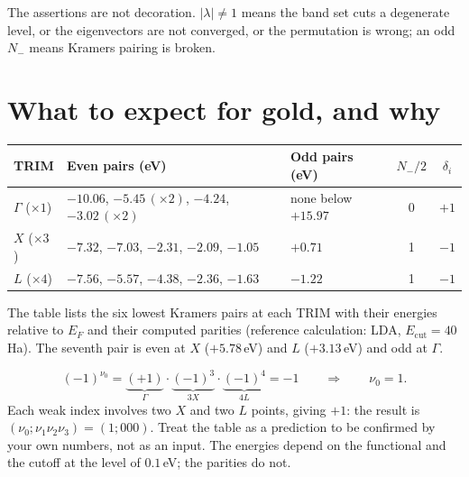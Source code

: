 The assertions are not decoration. $|\lambda| \ne 1$ means the band set
cuts a degenerate level, or the eigenvectors are not converged, or the
permutation is wrong; an odd $N_-$ means Kramers pairing is broken.

\section{What to expect for gold, and why}

\begin{center}
\begin{tabular}{@{}lllcc@{}}
\toprule
TRIM & Even pairs (eV) & Odd pairs (eV) & $N_-/2$ & $\delta_i$\\
\midrule
$\Gamma$ ($\times 1$) & $-10.06$, $-5.45\,(\times2)$, $-4.24$, $-3.02\,(\times2)$ & none below $+15.97$ & 0 & $+1$\\
$X$ ($\times 3$) & $-7.32$, $-7.03$, $-2.31$, $-2.09$, $-1.05$ & $+0.71$ & 1 & $-1$\\
$L$ ($\times 4$) & $-7.56$, $-5.57$, $-4.38$, $-2.36$, $-1.63$ & $-1.22$ & 1 & $-1$\\
\bottomrule
\end{tabular}
\end{center}
The table lists the six lowest Kramers pairs at each TRIM with their
energies relative to $E_F$ and their computed parities (reference
calculation: LDA, $E_{\mathrm{cut}}=40$\,Ha). The seventh pair is even at
$X$ ($+5.78$\,eV) and $L$ ($+3.13$\,eV) and odd at $\Gamma$.

\begin{equation}
(-1)^{\nu_0} = \underbrace{(+1)}_{\Gamma}\cdot\underbrace{(-1)^3}_{3X}
\cdot\underbrace{(-1)^4}_{4L} = -1
\qquad\Longrightarrow\qquad \nu_0 = 1 .
\end{equation}
Each weak index involves two $X$ and two $L$ points, giving $+1$: the
result is $(\nu_0;\nu_1\nu_2\nu_3) = (1;000)$. Treat the table as a
prediction to be confirmed by your own numbers, not as an input. The
energies depend on the functional and the cutoff at the level of
$0.1$\,eV; the parities do not.

